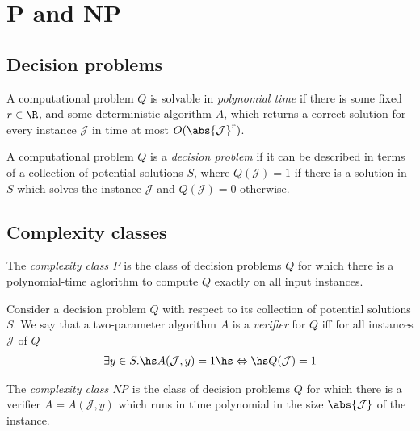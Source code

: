 \documentclass{article}
\begin{document}
\section{P and NP}

\subsection{Decision problems}

\begin{definition}
	A computational problem $Q$ is solvable in \emph{polynomial
	time} if there is some fixed $r\in\R$, and some deterministic
	algorithm $A$, which returns a correct solution for every
	instance $\mathcal{J}$ in time at most $O(\abs{\mathcal{J}}^r)$.
\end{definition}

\begin{definition}
	A computational problem $Q$ is a \emph{decision problem} if
	it can be described in terms of a collection of potential
	solutions $S$, where $Q(\mathcal{J})=1$ if there is a solution
	in $S$ which solves the instance $\mathcal{J}$ and $Q(\mathcal{J})=0$
	otherwise.
\end{definition}

\subsection{Complexity classes}

\begin{definition}
	The \emph{complexity class P} is the class of decision problems
	$Q$ for which there is a polynomial-time aglorithm to compute $Q$
	exactly on all input instances.
\end{definition}

\begin{definition}
	Consider a decision problem $Q$ with respect to its collection
	of potential solutions $S$. We say that a two-parameter algorithm 
	$A$ is a \emph{verifier} for $Q$ iff for all instances
	$\mathcal{J}$ of $Q$
	\begin{align*}
		\exists y\in S.\hs A(\mathcal{J},y)=1\hs\Leftrightarrow\hs Q(\mathcal{J})=1
	\end{align*}
\end{definition}

\begin{definition}
	The \emph{complexity class NP} is the class of decision problems $Q$
	for which there is a verifier $A=A(\mathcal{J}, y)$ which runs in time
	polynomial in the size $\abs{\mathcal{J}}$ of the instance.
\end{definition}
\end{document}
